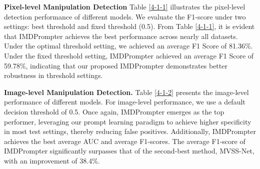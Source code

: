 \noindent\textbf{Pixel-level Manipulation Detection}
Table \ref{4-1-1} illustrates the pixel-level detection performance of different models. We evaluate the F1-score under two settings: best threshold and fixed threshold (0.5). From Table \ref{4-1-1}, it is evident that IMDPrompter achieves the best performance across nearly all datasets. Under the optimal threshold setting, we achieved an average F1 Score of 81.36\%. Under the fixed threshold setting, IMDPrompter achieved an average F1 Score of 59.78\%, indicating that our proposed IMDPrompter demonstrates better robustness in threshold settings.

\noindent\textbf{Image-level Manipulation Detection.}
Table \ref{4-1-2} presents the image-level performance of different models. For image-level performance, we use a default decision threshold of 0.5. Once again, IMDPrompter emerges as the top performer, leveraging our prompt learning paradigm to achieve higher specificity in most test settings, thereby reducing false positives. Additionally, IMDPrompter achieves the best average AUC and average F1-scores. The average F1-score of IMDPrompter significantly surpasses that of the second-best method, MVSS-Net, with an improvement of 38.4\%.





